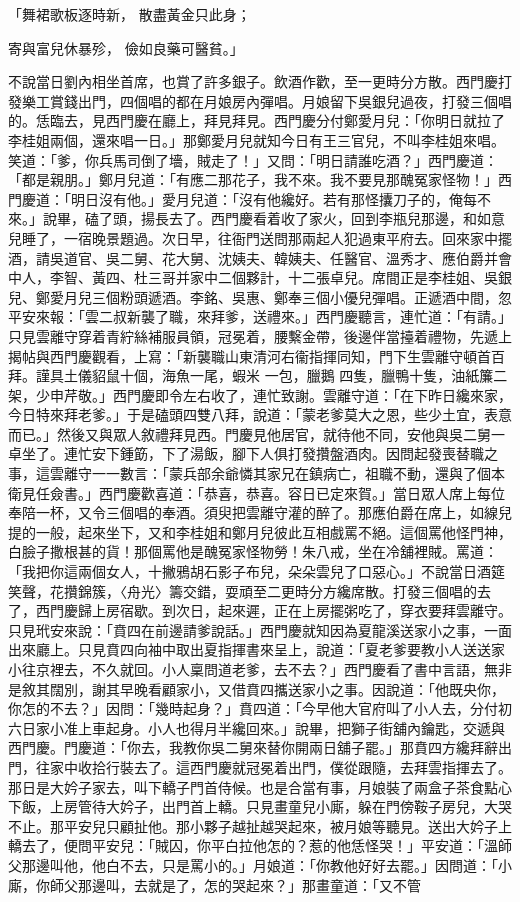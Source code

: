 \begin{showcontents}{}
「舞裙歌板逐時新，  散盡黃金只此身；

寄與富兒休暴殄，  儉如良藥可醫貧。」

不說當日劉內相坐首席，也賞了許多銀子。飲酒作歡，至一更時分方散。西門慶打發樂工賞錢出門，四個唱的都在月娘房內彈唱。月娘留下吳銀兒過夜，打發三個唱的。恁臨去，見西門慶在廳上，拜見拜見。西門慶分付鄭愛月兒：「你明日就拉了李桂姐兩個，還來唱一日。」那鄭愛月兒就知今日有王三官兒，不叫李桂姐來唱。笑道：「爹，你兵馬司倒了墻，賊走了！」又問：「明日請誰吃酒？」西門慶道：「都是親朋。」鄭月兒道：「有應二那花子，我不來。我不要見那醜冤家怪物！」西門慶道：「明日沒有他。」愛月兒道：「沒有他纔好。若有那怪攮刀子的，俺每不來。」說畢，磕了頭，揚長去了。西門慶看着收了家火，回到李瓶兒那邊，和如意兒睡了，一宿晚景題過。次日早，往衙門送問那兩起人犯過東平府去。回來家中擺酒，請吳道官、吳二舅、花大舅、沈姨夫、韓姨夫、任醫官、溫秀才、應伯爵并會中人，李智、黃四、杜三哥并家中二個夥計，十二張卓兒。席間正是李桂姐、吳銀兒、鄭愛月兒三個粉頭遞酒。李銘、吳惠、鄭奉三個小優兒彈唱。正遞酒中間，忽平安來報：「雲二叔新襲了職，來拜爹，送禮來。」西門慶聽言，連忙道：「有請。」只見雲離守穿着青紵絲補服員領，冠冕着，腰繫金帶，後邊伴當擡着禮物，先遞上揭帖與西門慶觀看，上寫：「新襲職山東清河右衞指揮同知，門下生雲離守頓首百拜。謹具土儀貂鼠十個，海魚一尾，蝦米 一包，臘鵝 四隻，臘鴨十隻，油紙簾二架，少申芹敬。」西門慶即令左右收了，連忙致謝。雲離守道：「在下昨日纔來家，今日特來拜老爹。」于是磕頭四雙八拜，說道：「蒙老爹莫大之恩，些少土宜，表意而已。」然後又與眾人敘禮拜見西。門慶見他居官，就待他不同，安他與吳二舅一卓坐了。連忙安下鍾筯，下了湯飯，腳下人俱打發攢盤酒肉。因問起發喪替職之事，這雲離守一一數言：「蒙兵部余爺憐其家兄在鎮病亡，祖職不動，還與了個本衛見任僉書。」西門慶歡喜道：「恭喜，恭喜。容日已定來賀。」當日眾人席上每位奉陪一杯，又令三個唱的奉酒。須臾把雲離守灌的醉了。那應伯爵在席上，如線兒提的一般，起來坐下，又和李桂姐和鄭月兒彼此互相戲罵不絕。這個罵他怪門神，白臉子撒根甚的貨！那個罵他是醜冤家怪物勞！朱八戒，坐在冷舖裡賊。罵道：「我把你這兩個女人，十撇鴉胡石影子布兒，朵朵雲兒了口惡心。」不說當日酒筵笑聲，花攢錦簇，〈舟光〉籌交錯，耍頑至二更時分方纔席散。打發三個唱的去了，西門慶歸上房宿歇。到次日，起來遲，正在上房擺粥吃了，穿衣要拜雲離守。只見玳安來說：「賁四在前邊請爹說話。」西門慶就知因為夏龍溪送家小之事，一面出來廳上。只見賁四向袖中取出夏指揮書來呈上，說道：「夏老爹要教小人送送家小往京裡去，不久就回。小人稟問道老爹，去不去？」西門慶看了書中言語，無非是敘其闊別，謝其早晚看顧家小，又借賁四攜送家小之事。因說道：「他既央你，你怎的不去？」因問：「幾時起身？」賁四道：「今早他大官府叫了小人去，分付初六日家小准上車起身。小人也得月半纔回來。」說畢，把獅子街舖內鑰匙，交遞與西門慶。門慶道：「你去，我教你吳二舅來替你開兩日舖子罷。」那賁四方纔拜辭出門，往家中收拾行裝去了。這西門慶就冠冕着出門，僕從跟隨，去拜雲指揮去了。那日是大妗子家去，叫下轎子門首侍候。也是合當有事，月娘裝了兩盒子茶食點心下飯，上房管待大妗子，出門首上轎。只見畫童兒小廝，躲在門傍鞍子房兒，大哭不止。那平安兒只顧扯他。那小夥子越扯越哭起來，被月娘等聽見。送出大妗子上轎去了，便問平安兒：「賊囚，你平白拉他怎的？惹的他恁怪哭！」平安道：「溫師父那邊叫他，他白不去，只是罵小的。」月娘道：「你教他好好去罷。」因問道：「小廝，你師父那邊叫，去就是了，怎的哭起來？」那畫童道：「又不管
\end{showcontents}

